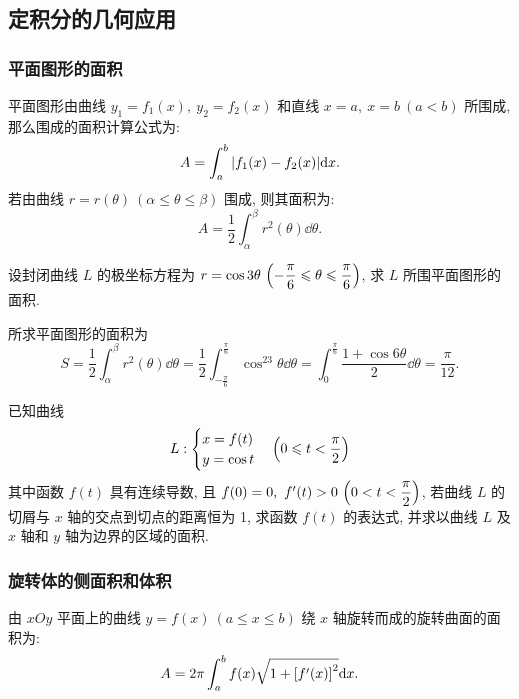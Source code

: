 \subsection{定积分的几何应用}

\subsubsection{平面图形的面积}

\begin{theorem}[平面图形面积公式]
    平面图形由曲线 $y_1=f_1(x),~y_2=f_2(x)$ 和直线 $x=a,~x=b~ (a<b)$ 所围成, 那么围成的面积计算公式为:
    $$A=\int_{a}^{b}\qty|f_1(x)-f_2(x)|\dd x.$$
    若由曲线 $r=r(\theta)~ (\alpha\leqslant \theta\leqslant \beta)$ 围成, 则其面积为:
    $$A=\dfrac{1}{2}\int_{\alpha}^{\beta}r^2(\theta)\dd \theta.$$
\end{theorem}

\begin{example}
    设封闭曲线 $L$ 的极坐标方程为 $r=\cos3\theta~ \qty(-\dfrac{\pi}{6}\leqslant \theta\leqslant\dfrac{\pi}{6})$, 求 $L$ 所围平面图形的面积.
\end{example}
\begin{solution}
    所求平面图形的面积为
    $$S=\dfrac{1}{2}\int_{\alpha}^{\beta}r^2(\theta)\dd \theta=\dfrac{1}{2}\int_{-\frac{\pi}{6}}^{\frac{\pi}{6}}\cos^23\theta\dd \theta=\int_{0}^{\frac{\pi}{6}}\dfrac{1+\cos6\theta}{2}\dd \theta=\dfrac{\pi}{12}.$$
\end{solution}

\begin{example}[2012 数一]
    已知曲线 $$L:\begin{cases}
            x=f(t) \\y=\cos t
        \end{cases}\qty(0\leqslant t<\dfrac{\pi}{2})$$
    其中函数 $f(t)$ 具有连续导数, 且 $f(0)=0,~f'(t)>0~ \qty(0<t<\dfrac{\pi}{2})$, 若曲线 $L$ 的切屑与 $x$ 轴的交点到切点的距离恒为 1, 求函数 $f(t)$ 的表达式,
    并求以曲线 $L$ 及 $x$ 轴和 $y$ 轴为边界的区域的面积.
\end{example}

\subsubsection{旋转体的侧面积和体积}

\begin{theorem}[旋转体的侧面积公式]
    由 $xOy$ 平面上的曲线 $y=f(x)~ (a\leqslant x\leqslant b)$ 绕 $x$ 轴旋转而成的旋转曲面的面积为:
    $$A=2\pi\int_{a}^{b}f(x)\sqrt{1+\qty[f'(x)]^2 }\dd x.$$
\end{theorem}

